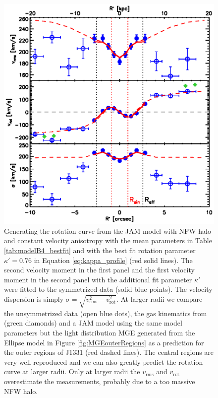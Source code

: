 \begin{figure}
\centering
\includegraphics[width=0.7\linewidth]{fig/B4_rms_rot_curves_best_model.ps}
\caption{Generating the rotation curve from the JAM model with NFW halo and constant velocity anisotropy with the mean parameters in Table \ref{tab:modelB4_bestfit} and with the best fit rotation parameter $\kappa' = 0.76$ in Equation \ref{eq:kappa_profile} (red solid lines). The second velocity moment in the first panel and the first velocity moment in the second panel with the additional fit parameter $\kappa'$ were fitted to the symmetrized data (solid blue points). The velocity dispersion is simply $\sigma = \sqrt{v_\text{rms}^2 - v_\text{rot}^2}$. At larger radii we compare the unsymmetrized data (open blue dots), the gas kinematics from \citet{SWELLSV} (green diamonds) and a JAM model using the same model parameters but the light distribution MGE generated from the Ellipse model in Figure \ref{fig:MGEouterRegions} as a prediction for the outer regions of J1331 (red dashed lines). The central regions are very well reproduced and we can also greatly predict the rotation curve at larger radii. Only at larger radii the $v_\text{rms}$ and $v_\text{rot}$ overestimate the measurements, probably due to a too massive NFW halo.}
\label{fig:modelB4_vrot}
\end{figure}
